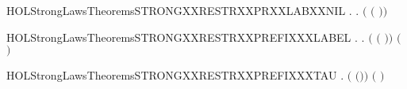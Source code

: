 \newcommand{\HOLStrongLawsTheoremsSTRONGXXRESTRXXNIL}{\UseVerbatim{HOLStrongLawsTheoremsSTRONGXXRESTRXXNIL}}
\begin{SaveVerbatim}{HOLStrongLawsTheoremsSTRONGXXRESTRXXPRXXLABXXNIL}
\HOLTokenTurnstile{} \HOLSymConst{\HOLTokenForall{}} .
      \HOLConst{\HOLTokenIn{}}  \HOLSymConst{\HOLTokenDisj{}}   \HOLConst{\HOLTokenIn{}}  \HOLSymConst{\HOLTokenImp{}} \HOLSymConst{\HOLTokenForall{}}.  \ensuremath{(}  \ensuremath{(} \HOLSymConst{\ensuremath{\ldotp}}\ensuremath{)}\ensuremath{)} 
\end{SaveVerbatim}
\newcommand{\HOLStrongLawsTheoremsSTRONGXXRESTRXXPRXXLABXXNIL}{\UseVerbatim{HOLStrongLawsTheoremsSTRONGXXRESTRXXPRXXLABXXNIL}}
\begin{SaveVerbatim}{HOLStrongLawsTheoremsSTRONGXXRESTRXXPREFIXXXLABEL}
\HOLTokenTurnstile{} \HOLSymConst{\HOLTokenForall{}} .
      \HOLConst{\HOLTokenNotIn{}}  \HOLSymConst{\HOLTokenConj{}}   \HOLConst{\HOLTokenNotIn{}}  \HOLSymConst{\HOLTokenImp{}}
     \HOLSymConst{\HOLTokenForall{}}.  \ensuremath{(}  \ensuremath{(} \HOLSymConst{\ensuremath{\ldotp}}\ensuremath{)}\ensuremath{)} \ensuremath{(} \HOLSymConst{\ensuremath{\ldotp}}  \ensuremath{)}
\end{SaveVerbatim}
\newcommand{\HOLStrongLawsTheoremsSTRONGXXRESTRXXPREFIXXXLABEL}{\UseVerbatim{HOLStrongLawsTheoremsSTRONGXXRESTRXXPREFIXXXLABEL}}
\begin{SaveVerbatim}{HOLStrongLawsTheoremsSTRONGXXRESTRXXPREFIXXXTAU}
\HOLTokenTurnstile{} \HOLSymConst{\HOLTokenForall{}} .  \ensuremath{(}  \ensuremath{(}\HOLConst{\ensuremath{\tau}}\HOLSymConst{\ensuremath{\ldotp}}\ensuremath{)}\ensuremath{)} \ensuremath{(}\HOLConst{\ensuremath{\tau}}\HOLSymConst{\ensuremath{\ldotp}}  \ensuremath{)}
\end{SaveVerbatim}
\newcommand{\HOLStrongLawsTheoremsSTRONGXXRESTRXXPREFIXXXTAU}{\UseVerbatim{HOLStrongLawsTheoremsSTRONGXXRESTRXXPREFIXXXTAU}}
